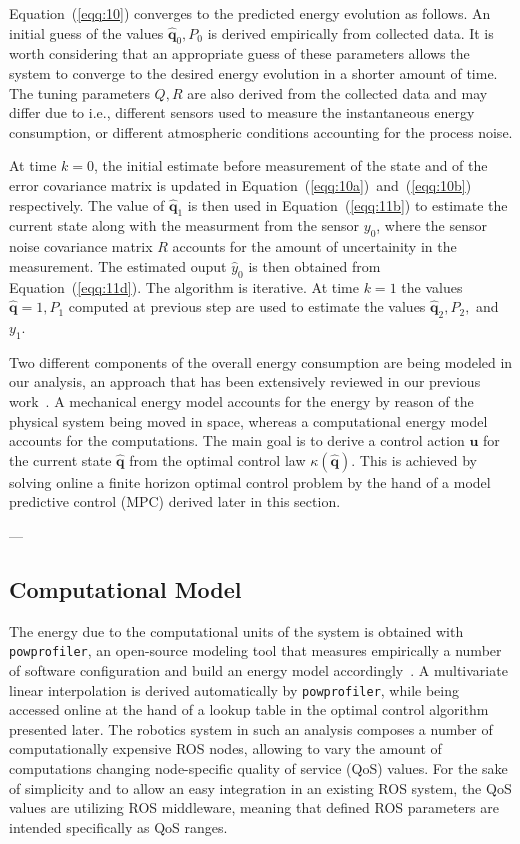 \documentclass[letterpaper,10pt,conference]{ieeeconf}
\newcommand{\stt}[1]{{\small\tt #1}} %
\newcommand{\powprof}{\stt{powprofiler}}
\begin{document}
Equation~(\ref{eqq:10}) converges to the predicted energy evolution as follows. An initial guess of the values $\hat{\mathbf{q}}_0,P_0$ is derived empirically from collected data. It is worth considering that an appropriate guess of these parameters allows the system to converge to the desired energy evolution in a shorter amount of time. The tuning parameters $Q,R$ are also derived from the collected data and may differ due to i.e., different sensors used to measure the instantaneous energy consumption, or different atmospheric conditions accounting for the process noise.

At time $k=0$, the initial estimate before measurement of the state and of the error covariance matrix is updated in Equation~(\ref{eqq:10a})~and~(\ref{eqq:10b}) respectively. The value of $\hat{\mathbf{q}}_1$ is then used in Equation~(\ref{eqq:11b}) to estimate the current state along with the measurment from the sensor $y_0$, where the sensor noise covariance matrix $R$ accounts for the amount of uncertainity in the measurement. The estimated ouput $\hat{y}_0$ is then obtained from Equation~(\ref{eqq:11d}). The algorithm is iterative. At time $k=1$ the values $\hat{\mathbf{q}}=1,P_1$ computed at previous step are used to estimate the values $\hat{\mathbf{q}}_2,P_2,$ and $y_1$.

Two different components of the overall energy consumption are being modeled in our analysis, an approach that has been extensively reviewed in our previous work~\cite{seewald2019coarse, seewald2019component, seewald2020mechanical, seewald2020towards}. A mechanical energy model accounts for the energy by reason of the physical system being moved in space, whereas a computational energy model accounts for the computations. The main goal is to derive a control action $\mathbf{u}$ for the current state $\hat{\mathbf{q}}$ from the optimal control law $\kappa(\hat{\mathbf{q}})$. This is achieved by solving online a finite horizon optimal control problem by the hand of a model predictive control (MPC) derived later in this section.

---

\subsection{Computational Model}

The energy due to the computational units of the system is obtained with \powprof{}, an open-source modeling tool that measures empirically a number of software configuration and build an energy model accordingly~\cite{seewald2019coarse}. A multivariate linear interpolation is derived automatically by \powprof{}, while being accessed online at the hand of a lookup table in the optimal control algorithm presented later. The robotics system in such an analysis composes a number of computationally expensive ROS nodes, allowing to vary the amount of computations changing node-specific quality of service (QoS) values. For the sake of simplicity and to allow an easy integration in an existing ROS system, the QoS values are utilizing ROS middleware, meaning that defined ROS parameters are intended specifically as QoS ranges.   
\end{document}
